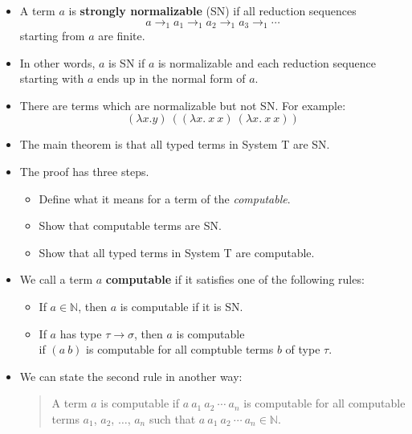 \documentclass[10pt]{article}
\begin{document}
    \begin{itemize}
      \item A term $a$ is {\bf strongly normalizable} (SN) if all reduction sequences
        $$a \rightarrow_1 a_1 \rightarrow_1 a_2 \rightarrow_1 a_3 \rightarrow_1 \dotsb$$
        starting from $a$ are finite.
        
      \item In other words, $a$ is SN if $a$ is normalizable and each reduction sequence starting
      with $a$ ends up in the normal form of $a$.
      
      \item There are terms which are normalizable but not SN. For example:
        $$(\lambda x. y)\ ((\lambda x.\ x\ x)\ (\lambda x.\ x\ x)) $$
        
      \item The main theorem is that all typed terms in System T are SN. 
      
      \item The proof has three steps.
        \begin{itemize}
          \item Define what it means for a term of the \emph{computable}.
          \item Show that computable terms are SN.
          \item Show that all typed terms in System T are computable.
        \end{itemize}
        
      \item We call a term $a$ {\bf computable} if it satisfies one of the following rules:
        \begin{itemize}
          \item If $a \in \mathbb{N}$, then $a$ is computable if it is SN.
          \item If $a$ has type $\tau \rightarrow \sigma$, then $a$ is computable\\ 
            if $(a\ b)$ is computable for all comptuble terms $b$ of type $\tau$.
        \end{itemize}
        
      \item We can state the second rule in another way:
        \begin{quote}
          A term $a$ is computable if $a\ a_1\ a_2\ \dotsb\ a_n$ is computable
          for all computable terms $a_1$, $a_2$, $\dotsc$, $a_n$ such
          that $a\ a_1\ a_2\ \dotsb\ a_n \in \mathbb{N}$.
        \end{quote}
        

\end{itemize}
\end{document}
